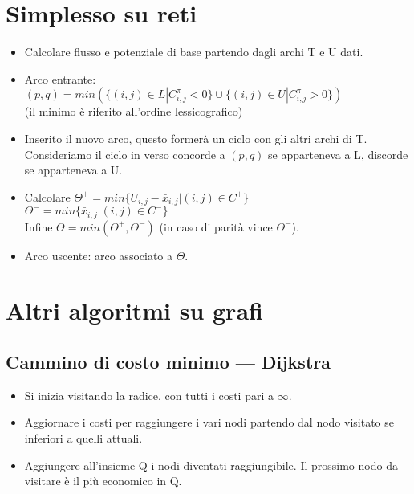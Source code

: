 \documentclass[9pt]{extarticle}
\begin{document}
\begin{multicols}{2}
\section{Simplesso su reti}
\begin{itemize}
    \setlength{\itemsep}{-3pt}
    \item Calcolare flusso e potenziale di base partendo dagli archi T e U
        dati.
    \item Arco entrante: \\
        $(p,q) = min(\{(i,j) \in L | C_{i,j}^\pi < 0\} \cup
        \{(i,j) \in U | C_{i,j}^\pi > 0\})$ \\
        (il minimo è riferito all'ordine lessicografico)
    \item Inserito il nuovo arco, questo formerà un ciclo con gli altri archi
        di T. Consideriamo il ciclo in verso concorde a $(p,q)$ se apparteneva
        a L, discorde se apparteneva a U.
    \item Calcolare $\Theta^+ = min\{U_{i,j}-\bar{x}_{i,j} | (i,j) \in C^+\}$\\
        $\Theta^- = min\{\bar{x}_{i,j} | (i,j) \in C^-\}$\\
        Infine $\Theta = min(\Theta^+, \Theta^-)$ (in caso di parità vince
        $\Theta^-$).
    \item Arco uscente: arco associato a $\Theta$.
\end{itemize}

\section{Altri algoritmi su grafi}
\subsection{Cammino di costo minimo --- Dijkstra}
\begin{itemize}
    \setlength{\itemsep}{-3pt}
    \item Si inizia visitando la radice, con tutti i costi pari a $\infty$.
    \item Aggiornare i costi per raggiungere i vari nodi partendo dal nodo
        visitato se inferiori a quelli attuali.
    \item Aggiungere all'insieme Q i nodi diventati raggiungibile. Il prossimo
        nodo da visitare è il più economico in Q.
\end{itemize}

\end{multicols}
\end{document}
